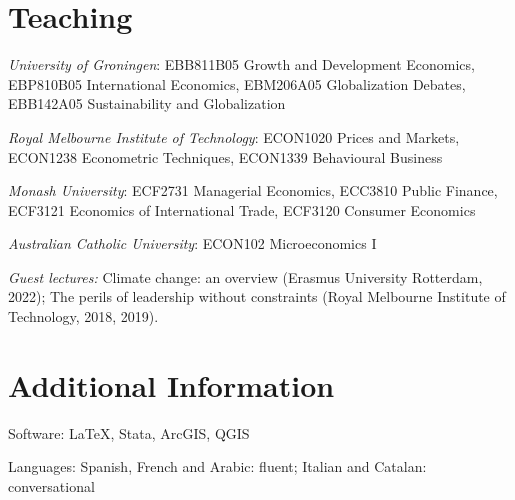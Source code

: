 \documentclass[letterpaper]{article}
\renewenvironment{itemize}{
  \begin{list}{}{
    \setlength{\leftmargin}{1.5em}
  }
}{
  \end{list}
}
\begin{document}
\section*{Teaching}
\begin{itemize}
	
	
	
	\item \textit{University of Groningen}: EBB811B05 Growth and Development Economics, EBP810B05 International Economics, EBM206A05 Globalization Debates, EBB142A05 Sustainability and Globalization
	
	\smallskip
	
	\item \textit{Royal Melbourne Institute of Technology}: ECON1020 Prices and Markets, ECON1238 Econometric Techniques, ECON1339 Behavioural Business
	
	
	
	\smallskip
	
	
	
	\item \textit{Monash University}:  ECF2731 Managerial Economics, ECC3810 Public Finance, ECF3121 Economics of International Trade, ECF3120 Consumer Economics
	
	\smallskip
	\item \textit{Australian Catholic University}: ECON102 Microeconomics I
	
		\smallskip
	\item \textit{Guest lectures:} Climate change: an overview (Erasmus University Rotterdam, 2022); The perils of leadership without constraints (Royal Melbourne Institute of Technology, 2018, 2019).
	
	
\end{itemize}





\section*{Additional Information}
\begin{itemize}
\item Software: \LaTeX, Stata, ArcGIS, QGIS
\item Languages: Spanish, French and Arabic: fluent; Italian and Catalan: conversational

\end{itemize}
\end{document}
